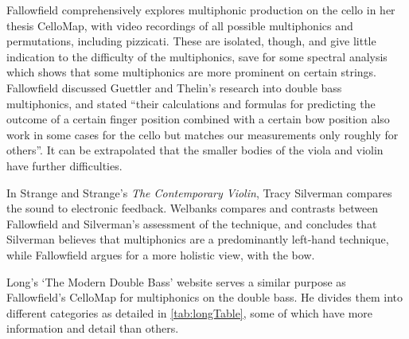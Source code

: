 Fallowfield comprehensively explores multiphonic production on the cello in her thesis CelloMap, with video recordings of all possible multiphonics and permutations, including pizzicati.\autocite{fallowfieldCelloMapHandbook2009}
These are isolated, though, and give little indication to the difficulty of the multiphonics, save for some spectral analysis which shows that some multiphonics are more prominent on certain strings.\autocite[http://www.cellomap.com/index/the-string/multiphonics-and-other-multiple-sounds/frequency-analysis.html]{fallowfieldCelloMap}
Fallowfield discussed Guettler and Thelin's research into double bass multiphonics, and stated ``their calculations and formulas for predicting the outcome of a certain finger position combined with a certain bow position also work in some cases for the cello but matches our measurements only roughly for others''.\autocite[http://www.cellomap.com/index/the-string/multiphonics-and-other-multiple-sounds/frequency-analysis.html]{fallowfieldCelloMap}
It can be extrapolated that the smaller bodies of the viola and violin have further difficulties.

In Strange and Strange's \emph{The Contemporary Violin}, Tracy Silverman compares the sound to electronic feedback.\autocite[132]{strangeContemporaryViolinExtended2001}
Welbanks compares and contrasts between Fallowfield and Silverman's assessment of the technique, and concludes that Silverman believes that multiphonics are a predominantly left-hand technique, while Fallowfield argues for a more holistic view, with the bow.\autocite[161--164]{welbanksFoundationsModernCello}

Long's `The Modern Double Bass' website serves a similar purpose as Fallowfield's CelloMap for multiphonics on the double bass.\autocite{longModernDoubleBass} 
He divides them into different categories as detailed in \autoref{tab:longTable}, some of which have more information and detail than others. 

